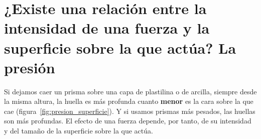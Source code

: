 %
%

\section[Fuerza y superficie: la presión]{¿Existe una relación entre la intensidad de una fuerza y la superficie sobre la que actúa? La presión}

Si dejamos caer un prisma sobre una capa de plastilina o de arcilla, siempre desde la misma altura, la huella es más profunda cuanto \textbf{menor} es la cara sobre la que cae (figura~\ref{fig:presion_superficie}). Y si usamos prismas más pesados, las huellas son más profundas. El efecto de una fuerza depende, por tanto, de su intensidad y del tamaño de la superficie sobre la que actúa.

